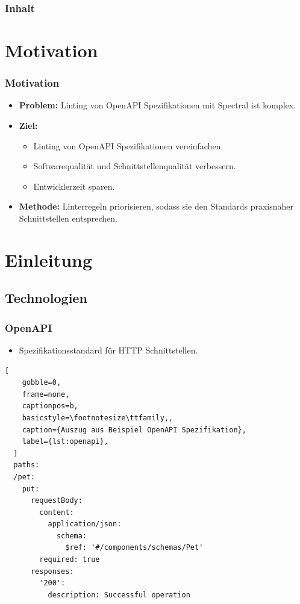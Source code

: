 \begin{frame}
  \frametitle{Inhalt}
  \tableofcontents
\end{frame}

\section{Motivation}
\begin{frame}\frametitle{Motivation}
  \begin{itemize}
    \item \textbf{Problem:} Linting von OpenAPI Spezifikationen mit Spectral ist komplex.
    \item \textbf{Ziel:}
    \begin{itemize}
      \item Linting von OpenAPI Spezifikationen vereinfachen.
      \item Softwarequalität und Schnittstellenqualität verbessern.
      \item Entwicklerzeit sparen.
    \end{itemize}
    \item \textbf{Methode:} Linterregeln priorisieren, sodass sie den Standards praxisnaher Schnittstellen entsprechen.
  \end{itemize}
\end{frame}

\section{Einleitung}
\subsection{Technologien}
\begin{frame}[fragile]
  \frametitle{OpenAPI}
  \begin{itemize}
    \item Spezifikationsstandard für HTTP Schnittstellen.
  \end{itemize}
  \lstset{language=none}
  \begin{lstlisting}[
    gobble=0,
    frame=none,
    captionpos=b,
    basicstyle=\footnotesize\ttfamily,,
    caption={Auszug aus Beispiel OpenAPI Spezifikation},
    label={lst:openapi},
  ]
  paths:
  /pet:
    put:
      requestBody:
        content:
          application/json:
            schema:
              $ref: '#/components/schemas/Pet'
        required: true
      responses:
        '200':
          description: Successful operation
  \end{lstlisting}
\end{frame}

